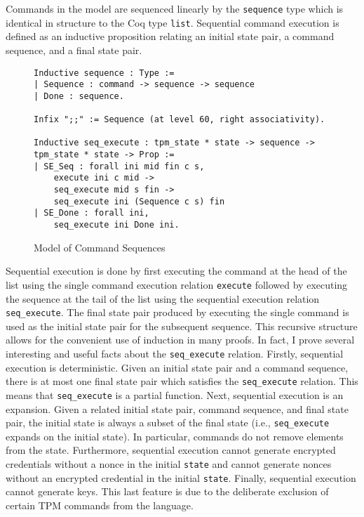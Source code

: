 Commands in the model are sequenced linearly by the \verb|sequence| type which is identical in structure to the Coq type \verb|list|. Sequential command execution is defined as an inductive proposition relating an initial state pair, a command sequence, and a final state pair. 
\begin{figure}[h]
\begin{lstlisting}[language=Coq]
Inductive sequence : Type :=
| Sequence : command -> sequence -> sequence
| Done : sequence.

Infix ";;" := Sequence (at level 60, right associativity).

Inductive seq_execute : tpm_state * state -> sequence -> tpm_state * state -> Prop :=
| SE_Seq : forall ini mid fin c s,
    execute ini c mid ->
    seq_execute mid s fin ->
    seq_execute ini (Sequence c s) fin
| SE_Done : forall ini,
    seq_execute ini Done ini.
\end{lstlisting}
\caption{Model of Command Sequences}
\end{figure}
Sequential execution is done by first executing the command at the head of the list using the single command execution relation \verb|execute| followed by executing the sequence at the tail of the list using the sequential execution relation \verb|seq_execute|. The final state pair produced by executing the single command is used as the initial state pair for the subsequent sequence. This recursive structure allows for the convenient use of induction in many proofs.
In fact, I prove several interesting and useful facts about the \verb|seq_execute| relation. Firstly, sequential execution is deterministic. Given an initial state pair and a command sequence, there is at most one final state pair which satisfies the \verb|seq_execute| relation. This means that \verb|seq_execute| is a partial function. Next, sequential execution is an expansion. Given a related initial state pair, command sequence, and final state pair, the initial state is always a subset of the final state (i.e., \verb|seq_execute| expands on the initial state). In particular, commands do not remove elements from the state.  Furthermore, sequential execution cannot generate encrypted credentials without a nonce in the initial \verb|state| and cannot generate nonces without an encrypted credential in the initial \verb|state|.  Finally, sequential execution cannot generate keys. This last feature is due to the deliberate exclusion of certain TPM commands from the language.
